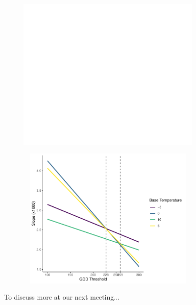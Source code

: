 \documentclass{article}\usepackage[]{graphicx}\usepackage[]{color}
\begin{document}
\begin{figure}
\label{fig:real}
\end{figure}

\begin{figure}
  \begin{subfigure}{\linewidth}
    \caption{}
    \centering
    \includegraphics[width=16cm]{..//analyses/figures/forecasting.pdf}
    \label{fig:forecasting}
    \end{subfigure}
  \begin{subfigure}{\linewidth}
	    \caption{}
      \centering
      \includegraphics[height=7cm, width=11cm]{..//analyses/figures/forecasting_slopes.pdf}
      \label{fig:slopes}
  \end{subfigure}
\caption{To discuss more at our next meeting...}
\label{fig:forecasts}
\end{figure}

  
  
\end{document}

